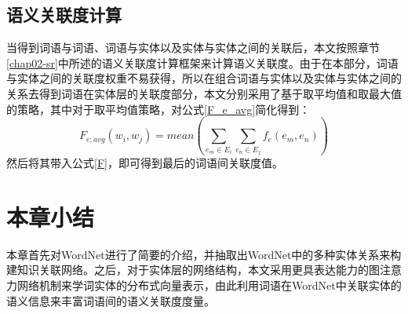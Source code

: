 \subsection{语义关联度计算}
当得到词语与词语、词语与实体以及实体与实体之间的关联后，本文按照章节\ref{chap02-sr}中所述的语义关联度计算框架来计算语义关联度。由于在本部分，词语与实体之间的关联度权重不易获得，所以在组合词语与实体以及实体与实体之间的关系去得到词语在实体层的关联度部分，本文分别采用了基于取平均值和取最大值的策略，其中对于取平均值策略，对公式\ref{F_e_avg}简化得到：
\begin{equation}
    F_{e;avg}(w_i, w_j) = mean(\sum_{e_m \in E_i}^{ }\sum_{e_n \in E_j}^{ }f_e(e_m, e_n))
    \label{F_e_avg_simple}
\end{equation}
\noindent 然后将其带入公式\ref{F}，即可得到最后的词语间关联度值。


\section{本章小结}
本章首先对WordNet进行了简要的介绍，并抽取出WordNet中的多种实体关系来构建知识关联网络。之后，对于实体层的网络结构，本文采用更具表达能力的图注意力网络机制来学词实体的分布式向量表示，由此利用词语在WordNet中关联实体的语义信息来丰富词语间的语义关联度度量。